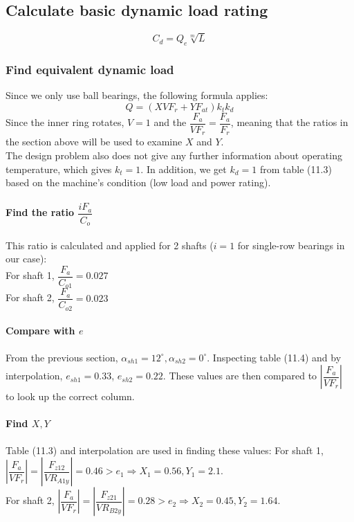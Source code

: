 \subsection{Calculate basic dynamic load rating}
\[C_d = Q_e\sqrt[m]{L}\]
\subsubsection{Find equivalent dynamic load} Since we only use ball bearings, the following formula applies:
\[Q = (XVF_r+YF_{at})k_tk_d\]
Since the inner ring rotates, $ V = 1 $ and the $\dfrac{F_a}{VF_r}=\dfrac{F_a}{F_r}$, meaning that the ratios in the section above will be used to examine $X$ and $Y$.\\
The design problem also does not give any further information about operating temperature, which gives $ k_t = 1 $. In addition, we get $ k_d = 1 $ from table (11.3) based on the machine's condition (low load and power rating).
\paragraph{Find the ratio $ \dfrac{iF_a}{C_o} $} This ratio is calculated and applied for 2 shafts ($ i = 1 $ for single-row bearings in our case):\\
For shaft 1, $ \dfrac{F_a}{C_{o1}} = 0.027$\\
For shaft 2, $ \dfrac{F_a}{C_{o2}}  =  0.023$
\paragraph{Compare with $ e $}
From the previous section, $ \alpha_{sh1} = 12^\circ, \alpha_{sh2} = 0^\circ $. Inspecting table (11.4) and by interpolation, $ e_{sh1} =  0.33$, $e_{sh2}  = 0.22 $. These values are then compared to $ \left| \dfrac{F_a}{VF_r} \right| $ to look up the correct column.
\paragraph{Find $ X,Y $} Table (11.3) and interpolation are used in finding these values:\vskip2mm
For shaft 1, $ \left| \dfrac{F_a}{VF_r} \right| = \left| \dfrac{F_{z12}}{VR_{A1y}} \right| = 0.46 > e_{1} \Rightarrow X_{1} = 0.56, Y_{1} = 2.1$.\\
For shaft 2, $ \left| \dfrac{F_a}{VF_r} \right| = \left| \dfrac{F_{z21}}{VR_{B2y}} \right| = 0.28 > e_{2} \Rightarrow X_{2}  =  0.45, Y_{2}  =  1.64$.
